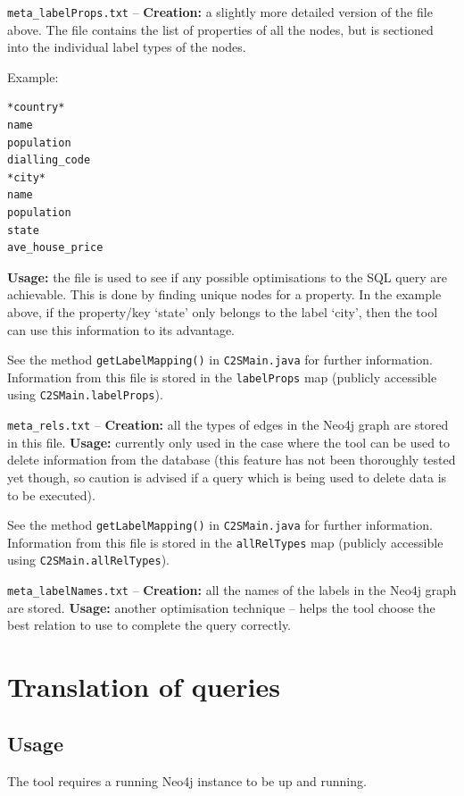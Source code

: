 \documentclass[letterpaper]{ltxdoc}
\begin{document}
\bigskip

\texttt{meta\_labelProps.txt} -- \textbf{Creation:} a slightly more detailed version of the file above. The file contains the list of properties of all the nodes, but is sectioned into the individual label types of the nodes.

Example:
\begin{verbatim}
*country*
name
population
dialling_code
*city*
name
population
state
ave_house_price
\end{verbatim}

\textbf{Usage:} the file is used to see if any possible optimisations to the SQL query are achievable. This is done by finding unique nodes for a property. In the example above, if the property/key `state' only belongs to the label `city', then the tool can use this information to its advantage.

See the method \texttt{getLabelMapping()} in \texttt{C2SMain.java} for further information. Information from this file is stored in the \texttt{labelProps} map (publicly accessible using \texttt{C2SMain.labelProps}).

\bigskip

\texttt{meta\_rels.txt} -- \textbf{Creation:} all the types of edges in the Neo4j graph are stored in this file.
\textbf{Usage:} currently only used in the case where the tool can be used to delete information from the database (this feature has not been thoroughly tested yet though, so caution is advised if a query which is being used to delete data is to be executed).

See the method \texttt{getLabelMapping()} in \texttt{C2SMain.java} for further information. Information from this file is stored in the \texttt{allRelTypes} map (publicly accessible using \texttt{C2SMain.allRelTypes}).

\bigskip

\texttt{meta\_labelNames.txt} -- \textbf{Creation:} all the names of the labels in the Neo4j graph are stored.
\textbf{Usage:} another optimisation technique -- helps the tool choose the best relation to use to complete the query correctly.


\section{Translation of queries}
\label{sec:tranQ}
\subsection{Usage}
\label{ssec:usage}
The tool requires a running Neo4j instance to be up and running.
\end{document}
